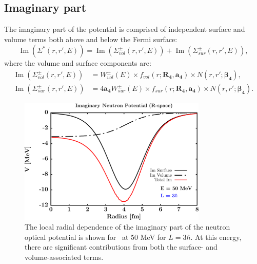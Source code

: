 \subsection{Imaginary part}
The imaginary part of the potential is comprised of independent surface and volume terms
both above and below the Fermi surface:
\begin{equation}
    \operatorname{Im}({\Sigma^{*}(r,r',E)}) =
    \operatorname{Im}({\Sigma_{vol}^{\pm}(r,r',E)})
    + \operatorname{Im}({\Sigma_{sur}^{\pm}(r,r',E)}),
\end{equation}
where the volume and surface components are:
\begin{equation}
    \begin{split}
        \operatorname{Im}({\Sigma_{vol}^{\pm}(r,r',E)})
        & = W_{vol}^{\pm}(E){\times}f_{vol}(r; \bm{R_{4}}, \bm{a_{4}})
        {\times}N(r,r'; \bm{\beta_{4}}),\\
        \operatorname{Im}({\Sigma_{sur}^{\pm}(r,r',E)})
        & = 4\bm{a_{4}}W_{sur}^{\pm}(E){\times}f_{sur}(r; \bm{R_{4}}, \bm{a_{4}})
        {\times} N(r,r';\bm{\beta_{4}}).
    \end{split}
\end{equation}
\begin{figure}[tb]
    \centering
    \includegraphics[width=0.8\textwidth]{figures/ImPotentialRSpace.png}
    \caption[Radial dependence of the imaginary part of the potential]
    {
        The local radial dependence of the imaginary part of the neutron optical potential is shown
        for \caForty\ at 50 MeV for $L=3\hbar$. At this energy, there are
        significant contributions from both the surface- and volume-associated
        terms.
    }
    \label{ImaginaryRadialDependence}
\end{figure}
